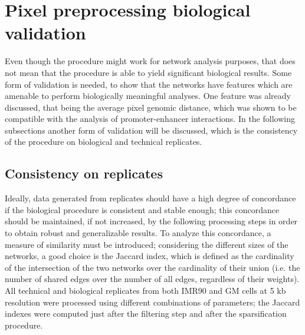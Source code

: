 \section{Pixel preprocessing biological validation}

Even though the procedure might work for network analysis purposes, that does not mean that the procedure is able to yield significant biological results. Some form of validation is needed, to show that the networks have features which are amenable to perform biologically meaningful analyses. One feature was already discussed, that being the average pixel genomic distance, which was shown to be compatible with the analysis of promoter-enhancer interactions. In the following subsections another form of validation will be discussed, which is the consistency of the procedure on biological and technical replicates.

\subsection{Consistency on replicates}

Ideally, data generated from replicates should have a high degree of concordance if the biological procedure is consistent and stable enough; this concordance should be maintained, if not increased, by the following processing steps in order to obtain robust and generalizable results. To analyze this concordance, a measure of similarity must be introduced; considering the different sizes of the networks, a good choice is the Jaccard index, which is defined as the cardinality of the intersection of the two networks over the cardinality of their union (i.e. the number of shared edges over the number of all edges, regardless of their weights). All technical and biological replicates from both IMR90 and GM cells at 5 kb resolution were processed using different combinations of parameters; the Jaccard indexes were computed just after the filtering step and after the sparsification procedure.

